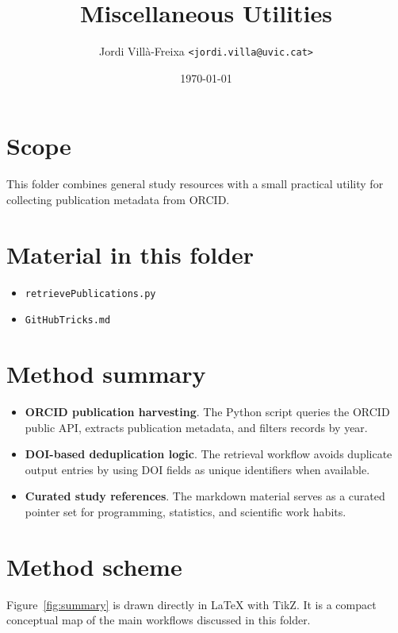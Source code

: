 \documentclass[11pt,a4paper]{article}
\title{Miscellaneous Utilities}
\author{Jordi Vill\`a-Freixa \texttt{<jordi.villa@uvic.cat>}}
\date{\today}
\begin{document}
    \maketitle

    \section*{Scope}
    This folder combines general study resources with a small practical utility for collecting publication metadata from ORCID.

    \section*{Material in this folder}
    \begin{itemize}[leftmargin=*]
\item \texttt{retrievePublications.py}
\item \texttt{GitHubTricks.md}
    \end{itemize}

    \section*{Method summary}
    \begin{itemize}[leftmargin=*]
\item \textbf{ORCID publication harvesting}. The Python script queries the ORCID public API, extracts publication metadata, and filters records by year.
\item \textbf{DOI-based deduplication logic}. The retrieval workflow avoids duplicate output entries by using DOI fields as unique identifiers when available.
\item \textbf{Curated study references}. The markdown material serves as a curated pointer set for programming, statistics, and scientific work habits.
    \end{itemize}

    \section*{Method scheme}
    Figure~\ref{fig:summary} is drawn directly in LaTeX with TikZ. It is a compact conceptual map of the main workflows discussed in this folder.
\end{document}
